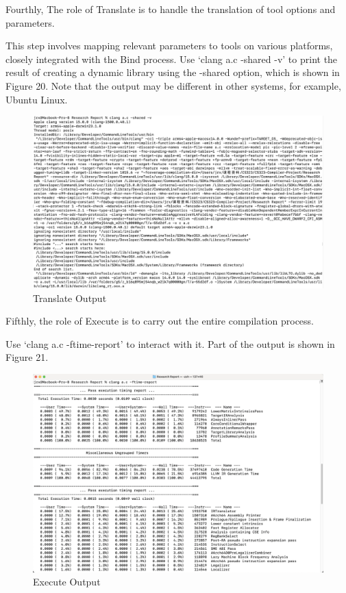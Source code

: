 \documentclass[conference]{IEEEtran}
\begin{document}
Fourthly, The role of Translate is to handle the translation of tool options and parameters.

This step involves mapping relevant parameters to tools on various platforms, closely integrated with the Bind process. Use `clang a.c -shared -v' to print the result of creating a dynamic library using the -shared option, which is shown in Figure 20. Note that the output may be different in other systems, for example, Ubuntu Linux.

\begin{figure}[htbp]
\centering
\includegraphics [width=1\linewidth]{pictures/Translate.png}
\caption{Translate Output}
\label{fig20}
\end{figure}

Fifthly, the role of Execute is to carry out the entire compilation process.

Use `clang a.c -ftime-report' to interact with it. Part of the output is shown in Figure 21.

\begin{figure}[htbp]
\centering
\includegraphics [width=1\linewidth]{pictures/Execute.png}
\caption{Execute Output}
\label{fig21}
\end{figure}
\end{document}
